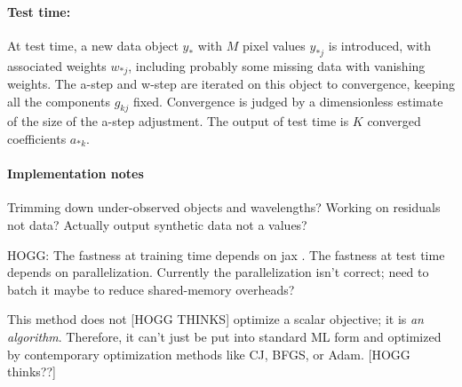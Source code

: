 \documentclass{article}
\begin{document}
\paragraph{Test time:}
At test time, a new data object $y_\ast$ with $M$ pixel values $y_{\ast j}$ is introduced, with associated weights $w_{\ast j}$, including probably some missing data with vanishing weights.
The a-step and w-step are iterated on this object to convergence, keeping all the components $g_{kj}$ fixed.
Convergence is judged by a dimensionless estimate of the size of the a-step adjustment.
The output of test time is $K$ converged coefficients $a_{\ast k}$.

\paragraph{Implementation notes}
Trimming down under-observed objects and wavelengths?
Working on residuals not data?
Actually output synthetic data not a values?

HOGG: The fastness at training time depends on jax \cite{jax}.
The fastness at test time depends on parallelization.
Currently the parallelization isn't correct; need to batch it maybe to reduce shared-memory overheads?

This method does not [HOGG THINKS] optimize a scalar objective; it is \emph{an algorithm}.
Therefore, it can't just be put into standard ML form and optimized by contemporary optimization methods like CJ, BFGS, or Adam.
[HOGG thinks??]

\raggedright\footnotesize


\end{document}
